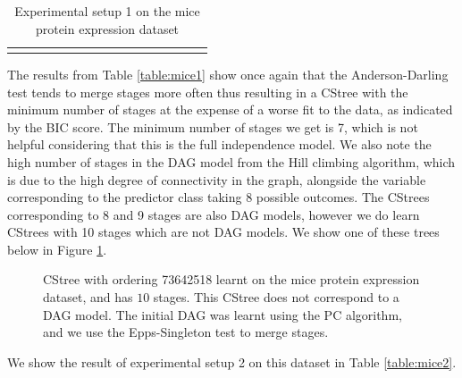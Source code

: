 \documentclass{tufte-book}
\begin{document}
\begin{table}[]
\begin{tabular}{cccccccccccccccc}
                        &                                                                                                  &                                 &                              &                             &                              &                             &                              &                             &                              &                             &                              &  &  &  & 
\caption{Experimental setup 1 on the mice protein expression dataset}
			\end{tabular}
\end{table}


The results from Table \ref{table:mice1} show once again that the Anderson-Darling test tends to merge stages more often thus resulting in a CStree with the minimum number of stages at the expense of a worse fit to the data, as indicated by the BIC score. The minimum number of stages we get is 7, which is not helpful considering that this is the full independence model. We also note the high number of stages in the DAG model from the Hill climbing algorithm, which is due to the high degree of connectivity in the graph, alongside the variable corresponding to the predictor class taking 8 possible outcomes. The CStrees corresponding to 8 and 9 stages are also DAG models, however we do learn CStrees with 10 stages which are not DAG models. We show one of these trees below in Figure \ref{fig:mice10stage}.



\begin{figure}[]\label{fig:mice10stage}
   \begin{floatrow}
%
\caption{CStree with ordering 73642518 learnt on the mice protein expression dataset, and has $10$ stages. This CStree does not correspond to a DAG model. The initial DAG was learnt using the PC algorithm, and we use the Epps-Singleton test to merge stages.}
        
   \end{floatrow}
\end{figure}


We show the result of experimental setup 2 on this dataset in Table \ref{table:mice2}.

\end{document}
